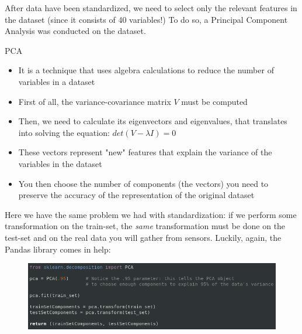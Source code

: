 	\begin{frame}
		After data have been standardized, we need to select only the relevant features in the dataset (since it consists of 40 variables!)\newline\newline
		To do so, a Principal Component Analysis was conducted on the dataset.
		\begin{block}{PCA}
			\begin{itemize}
			
				\item It is a technique that uses algebra calculations to reduce the number of variables in a dataset
				\item First of all, the variance-covariance matrix $V$ must be computed
				\item Then, we need to calculate its eigenvectors and eigenvalues, that translates into solving the equation: $det( V - \lambda I) = 0$
				\item These vectors represent "new" features that explain the variance of the variables in the dataset
				\item You then choose the number of components (the vectors) you need to preserve the accuracy of the representation of the original dataset
			\end{itemize}
		\end{block}
	\end{frame}
	
	\begin{frame}
		Here we have the same problem we had with standardization: if we perform some transformation on the train-set, the \emph{same} transformation must be done on the test-set and on the real data you will gather from sensors.\newline\newline
		Luckily, again, the Pandas library comes in help:
		\begin{figure}
			\includegraphics[width=\textwidth,height=\textheight,keepaspectratio]{img/PCA.png}
		\end{figure}
	\end{frame}
	
